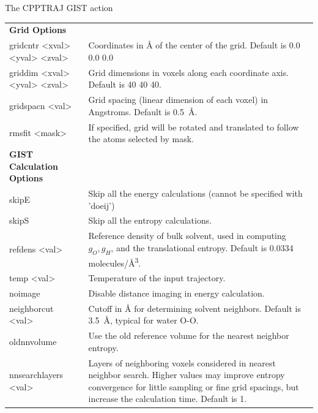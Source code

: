 \documentclass[9pt,tutorial]{livecoms}
\begin{document}
\begin{Checklists*}[h!]
\begin{checklist}{The CPPTRAJ GIST action}
\begin{tabularx}{\textwidth}{@{}l X @{} }
\textbf{Grid Options} &\\
gridcntr <xval> <yval> <zval> & Coordinates in \AA{} of the center of the grid. Default is 0.0 0.0 0.0 \\
griddim <xval> <yval> <zval> & Grid dimensions in voxels along each coordinate axis. Default is 40 40 40.\\
gridspacn <val> & Grid spacing (linear dimension of each voxel) in 
Angstroms. Default is \qty{0.5}{\angstrom}.\\
rmsfit <mask> & If specified, grid will be rotated and translated to follow the atoms selected by mask. \\
\textbf{GIST Calculation Options} &\\

skipE & Skip all the energy calculations (cannot be specified with ’doeij’)\\
skipS & Skip all the entropy calculations.\\
refdens <val> & Reference density of bulk solvent, used in computing 
$g_O, g_H$, and the translational entropy. Default is 0.0334 molecules/\unit{\cubic\angstrom}. \\
temp <val> & Temperature of the input trajectory. \\
noimage &  Disable distance imaging in energy calculation. \\

neighborcut <val> & Cutoff in \unit{\angstrom} for determining solvent neighbors. Default is \qty{3.5}{\angstrom}, typical for water O-O. \\

oldnnvolume & Use the old reference volume for the nearest neighbor entropy. \\

nnsearchlayers <val> & Layers of neighboring voxels considered in nearest neighbor search. Higher values may improve entropy convergence for little sampling or fine grid spacings, but increase the calculation time. Default is 1. \\


\end{tabularx}
\end{checklist}
\end{Checklists*}
\end{document}
